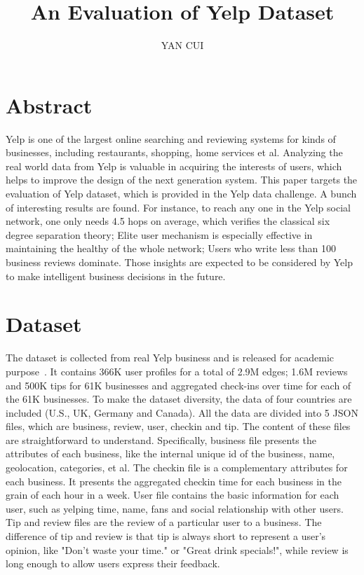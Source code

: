\documentclass[11pt, oneside]{article}   	%
\title{An Evaluation of Yelp Dataset}
\author{YAN CUI}
\affil{Columbia University}
\begin{document}
\maketitle
\section{Abstract}
Yelp is one of the largest online searching and reviewing systems for kinds of businesses, including restaurants, shopping, 
home services et al.  Analyzing the real world data from Yelp is valuable in acquiring the interests of users, which helps to 
improve the design of the next generation system. This paper targets the evaluation of Yelp dataset, which is provided in
the Yelp data challenge. A bunch of interesting results are found. For instance, to reach any one in the Yelp social network, 
one only needs 4.5 hops on average, which verifies the classical six degree separation theory; 
Elite user mechanism is especially effective in maintaining the healthy of the whole network; Users who write less than 
100 business reviews dominate. Those insights are expected to be considered by Yelp to make intelligent 
business decisions in the future. 
   
\section{Dataset}
The dataset is collected from real Yelp business and is released for academic purpose~\cite{dataset}.  It contains 366K user 
profiles for a total of 2.9M edges; 1.6M reviews and 500K tips for 61K businesses and aggregated check-ins over time for 
each of the 61K businesses. To make the dataset diversity, the data of four countries are included (U.S., UK, Germany and 
Canada). All the data are divided into 5 JSON files, which are business, review, user, checkin and tip. The content of these files 
are straightforward to understand. Specifically, business file presents the attributes of each business, like the internal unique id of the 
business, name, geolocation, categories, et al. The checkin file is a complementary attributes for each business. It presents
the aggregated checkin time for each business in the grain of each hour in a week. User file contains the basic information for 
each user, such as yelping time, name, fans and social relationship with other users. Tip and review files are the review of a 
particular user to a business. The difference of tip and review is that tip is always short to represent a user's opinion, like 
"Don't waste your time." or "Great drink specials!", while review is long enough to allow users express their feedback.
\end{document}
